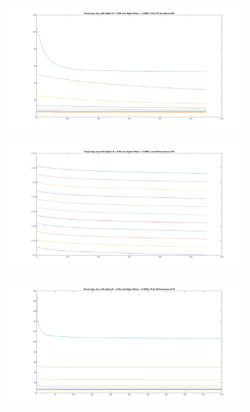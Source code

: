 \documentclass{article}
\newcommand{\0}{\mathrm{0}}
\newcommand{\1}{\mathrm{1}}
\begin{document}
  \begin{figure}[H]
    \centering
  \begin{subfigure}[b]{0.3\textwidth}
    \includegraphics[width=\textwidth]{fixed-step-change-alpha-H-first.png}
  \end{subfigure}
\centering
  \begin{subfigure}[b]{0.3\textwidth}
    \includegraphics[width=\textwidth]{fixed-step-change-alpha-H-last.png}
  \end{subfigure}
\centering
  \begin{subfigure}[b]{0.3\textwidth}
    \includegraphics[width=\textwidth]{fixed-step-change-alpha-W-first.png}

\end{subfigure}
\end{figure}
\end{document}
